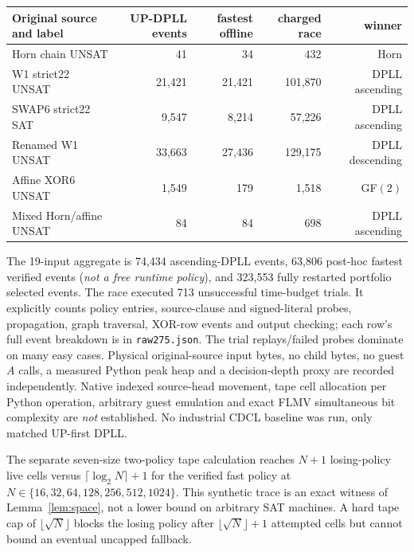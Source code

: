 \documentclass[11pt]{article}
\begin{document}
\begin{center}\small
\begin{tabular}{lrrrr}
\toprule
Original source and label & UP-DPLL events & fastest offline & charged race & winner\\\midrule
Horn chain UNSAT & 41 & 34 & 432 & Horn\\
W1 strict22 UNSAT & 21,421 & 21,421 & 101,870 & DPLL ascending\\
SWAP6 strict22 SAT & 9,547 & 8,214 & 57,226 & DPLL ascending\\
Renamed W1 UNSAT & 33,663 & 27,436 & 129,175 & DPLL descending\\
Affine XOR6 UNSAT & 1,549 & 179 & 1,518 & GF$(2)$\\
Mixed Horn/affine UNSAT & 84 & 84 & 698 & DPLL ascending\\\bottomrule
\end{tabular}
\end{center}

The 19-input aggregate is 74,434 ascending-DPLL events, 63,806 post-hoc fastest verified events (\emph{not a free runtime policy}), and 323,553 fully restarted portfolio selected events. The race executed 713 unsuccessful time-budget trials. It explicitly counts policy entries, source-clause and signed-literal probes, propagation, graph traversal, XOR-row events and output checking; each row's full event breakdown is in \texttt{raw275.json}. The trial replays/failed probes dominate on many easy cases. Physical original-source input bytes, no child bytes, no guest $A$ calls, a measured Python peak heap and a decision-depth proxy are recorded independently. Native indexed source-head movement, tape cell allocation per Python operation, arbitrary guest emulation and exact FLMV simultaneous bit complexity are \emph{not} established. No industrial CDCL baseline was run, only matched UP-first DPLL.

The separate seven-size two-policy tape calculation reaches $N+1$ losing-policy live cells versus $\lceil\log_2N\rceil+1$ for the verified fast policy at $N\in\{16,32,64,128,256,512,1024\}$. This synthetic trace is an exact witness of Lemma~\ref{lem:space}, not a lower bound on arbitrary SAT machines. A hard tape cap of $\lfloor\sqrt N\rfloor$ blocks the losing policy after $\lfloor\sqrt N\rfloor+1$ attempted cells but cannot bound an eventual uncapped fallback.
\end{document}
